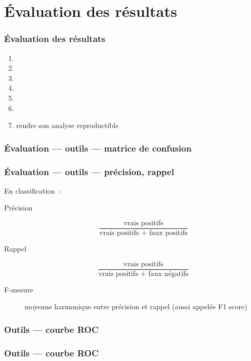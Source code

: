 \documentclass{formation}
\begin{document}
\section{Évaluation des résultats}

\begin{frame}
  \frametitle{Évaluation des résultats}

  \begin{enumerate}
  \item {}
  \item {}
  \item {}
  \item {}
  \item {}
  \item {}
  \item rendre son analyse reproductible
  \end{enumerate}
\end{frame}

\begin{frame}
  \frametitle{Évaluation — outils — matrice de confusion}
\end{frame}

\begin{frame}
  \frametitle{Évaluation — outils — précision, rappel}

  En classification :

  \begin{description}
  \item[Précision]
    \[
    \frac{\text{vrais positifs}}{\text{vrais positifs + faux positifs}}
    \]
  \item[Rappel]
    \[
    \frac{\text{vrais positifs}}{\text{vrais positifs + faux négatifs}}
  \]
  \item[F-mesure] moyenne harmonique entre précision et rappel (aussi
    appelée F1 score)
  \end{description}
\end{frame}

\begin{frame}
  \frametitle{Outils — courbe ROC}

\end{frame}

\begin{frame}
  \frametitle{Outils — courbe ROC}

\end{frame}
\end{document}
